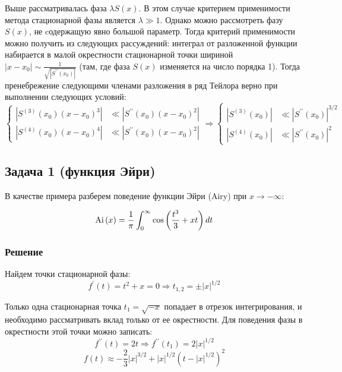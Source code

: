 \documentclass[a4paper,12pt]{article}
\begin{document}
Выше рассматривалась фаза $\lambda S(x)$. В этом случае критерием применимости метода стационарной фазы является $\lambda\gg 1$. Однако можно рассмотреть фазу $S(x)$, не cодержащую явно большой параметр. Тогда критерий применимости можно получить из следующих рассуждений: интеграл
от разложенной функции набирается в малой окрестности стационарной
точки шириной $|x-x_{0}|\sim\frac{1}{\sqrt{|S^{\prime\prime}(x_{0})|}}$
(там, где фаза $S(x)$ изменяется на число порядка 1). Тогда пренебрежение
следующими членами разложения в ряд Тейлора верно при выполнении следующих
условий: 
\[
\begin{cases}
|S^{(3)}(x_{0})(x-x_{0})^{3}| & \ll|S^{\prime\prime}(x_{0})(x-x_{0})^{2}|\\
|S^{(4)}(x_{0})(x-x_{0})^{4}| & \ll|S^{\prime\prime}(x_{0})(x-x_{0})^{2}|
\end{cases}\Rightarrow\begin{cases}
|S^{(3)}(x_{0})| & \ll|S^{\prime\prime}(x_{0})|^{3/2}\\
|S^{(4)}(x_{0})| & \ll|S^{\prime\prime}(x_{0})|^{2}
\end{cases}
\]



\subsection*{Задача 1 (функция Эйри)}

В качестве примера разберем поведение функции Эйри (Airy) при $x\to-\infty$:

\[
{\rm Ai}\left(x\right)=\frac{1}{\pi}\int_{0}^{\infty}\cos\left(\frac{t^{3}}{3}+xt\right)dt
\]



\subsubsection*{Решение}

Найдем точки стационарной фазы:
\[
f^{\prime}(t)=t^{2}+x=0\Rightarrow t_{1,2}=\pm|x|^{1/2}
\]

\noindent
Только одна стационарная точка $t_{1}=\sqrt{-x}$ попадает в отрезок
интегрирования, и необходимо рассматривать вклад только от ее окрестности.
Для поведения фазы в окрестности этой точки можно записать:
\[
f^{\prime\prime}(t)=2t\Rightarrow f^{\prime\prime}(t_{1})=2|x|^{1/2}
\]
\[
f(t)\approx-\frac{2}{3}|x|^{3/2}+|x|^{1/2}(t-|x|^{1/2})^{2}
\]
\end{document}
